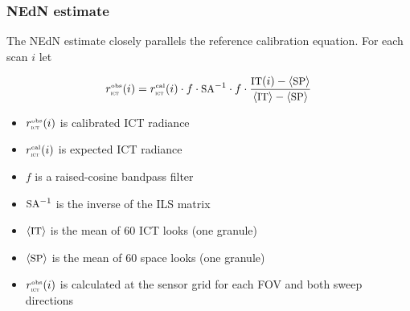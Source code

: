\documentclass[11pt]{beamer}
\begin{document}
% 
\begin{frame}
\frametitle{NEdN estimate}

The NEdN estimate closely parallels the reference calibration
equation.  For each scan $i$ let

\[r_{\mbox{\tiny\textsc{ict}}}^{\mbox{\tiny obs}}(i) = r_{\mbox{\tiny\textsc{ict}}}^{\mbox{\tiny cal}}(i) \cdot f \cdot \mbox{\small SA}^{-1}\cdot f \cdot 
               \frac{\mbox{\small IT}(i) - \langle\mbox{\small SP}\rangle}{\langle\mbox{\small IT}\rangle - \langle\mbox{\small SP}\rangle} \]

\begin{itemize}
  \item $r_{\mbox{\tiny\textsc{ict}}}^{\mbox{\tiny obs}}(i)$ is calibrated ICT radiance
  \item $r_{\mbox{\tiny\textsc{ict}}}^{\mbox{\tiny cal}}(i)$ is expected ICT radiance
  \item $f$ is a raised-cosine bandpass filter
  \item $\mbox{\small SA}^{-1}$ is the inverse of the ILS matrix
  \item $\langle\mbox{\small IT}\rangle$ is the mean of 60 ICT looks (one granule)
  \item $\langle\mbox{\small SP}\rangle$ is the mean of 60 space looks (one granule)
  \item $r_{\mbox{\tiny\textsc{ict}}}^{\mbox{\tiny obs}}(i)$ is calculated at the sensor grid for each 
    FOV and both sweep directions
\end{itemize}

\end{frame}
\end{document}
